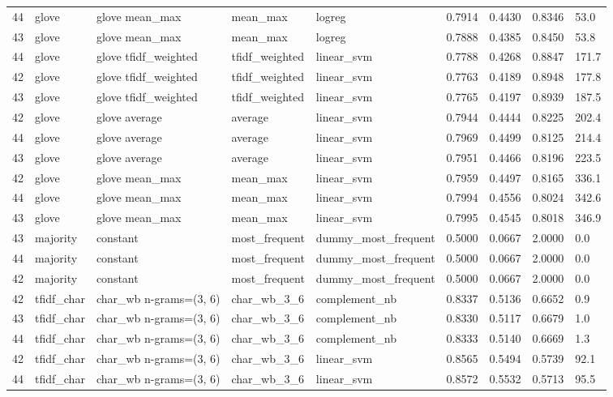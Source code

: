 \begin{table}[htbp]
\begin{tabular}{lllllllll}
44 & glove & glove mean\_max & mean\_max & logreg & 0.7914 & 0.4430 & 0.8346 & 53.0 \\
43 & glove & glove mean\_max & mean\_max & logreg & 0.7888 & 0.4385 & 0.8450 & 53.8 \\
44 & glove & glove tfidf\_weighted & tfidf\_weighted & linear\_svm & 0.7788 & 0.4268 & 0.8847 & 171.7 \\
42 & glove & glove tfidf\_weighted & tfidf\_weighted & linear\_svm & 0.7763 & 0.4189 & 0.8948 & 177.8 \\
43 & glove & glove tfidf\_weighted & tfidf\_weighted & linear\_svm & 0.7765 & 0.4197 & 0.8939 & 187.5 \\
42 & glove & glove average & average & linear\_svm & 0.7944 & 0.4444 & 0.8225 & 202.4 \\
44 & glove & glove average & average & linear\_svm & 0.7969 & 0.4499 & 0.8125 & 214.4 \\
43 & glove & glove average & average & linear\_svm & 0.7951 & 0.4466 & 0.8196 & 223.5 \\
42 & glove & glove mean\_max & mean\_max & linear\_svm & 0.7959 & 0.4497 & 0.8165 & 336.1 \\
44 & glove & glove mean\_max & mean\_max & linear\_svm & 0.7994 & 0.4556 & 0.8024 & 342.6 \\
43 & glove & glove mean\_max & mean\_max & linear\_svm & 0.7995 & 0.4545 & 0.8018 & 346.9 \\
43 & majority & constant & most\_frequent & dummy\_most\_frequent & 0.5000 & 0.0667 & 2.0000 & 0.0 \\
44 & majority & constant & most\_frequent & dummy\_most\_frequent & 0.5000 & 0.0667 & 2.0000 & 0.0 \\
42 & majority & constant & most\_frequent & dummy\_most\_frequent & 0.5000 & 0.0667 & 2.0000 & 0.0 \\
42 & tfidf\_char & char\_wb n-grams=(3, 6) & char\_wb\_3\_6 & complement\_nb & 0.8337 & 0.5136 & 0.6652 & 0.9 \\
43 & tfidf\_char & char\_wb n-grams=(3, 6) & char\_wb\_3\_6 & complement\_nb & 0.8330 & 0.5117 & 0.6679 & 1.0 \\
44 & tfidf\_char & char\_wb n-grams=(3, 6) & char\_wb\_3\_6 & complement\_nb & 0.8333 & 0.5140 & 0.6669 & 1.3 \\
42 & tfidf\_char & char\_wb n-grams=(3, 6) & char\_wb\_3\_6 & linear\_svm & 0.8565 & 0.5494 & 0.5739 & 92.1 \\
44 & tfidf\_char & char\_wb n-grams=(3, 6) & char\_wb\_3\_6 & linear\_svm & 0.8572 & 0.5532 & 0.5713 & 95.5 \\

\end{tabular}
\end{table}
